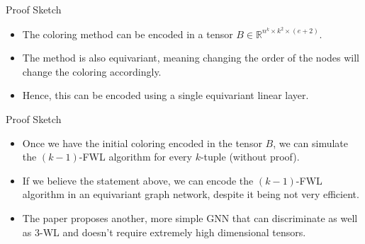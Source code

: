 \documentclass{beamer}
\begin{document}
\begin{frame}{Proof Sketch}
    \begin{itemize}
        \item The coloring method can be encoded in a tensor $B \in \mathbb{R}^{n^k \times k^2 \times (e+2)}$.
        \item The method is also equivariant, meaning changing the order of the nodes will change the coloring accordingly.
        \item Hence, this can be encoded using a single equivariant linear layer.
    \end{itemize}
\end{frame}
\begin{frame}{Proof Sketch}
    \begin{itemize}
        \item Once we have the initial coloring encoded in the tensor $B$, we can simulate the $(k-1)$-FWL algorithm for every $k$-tuple (without proof).
        \item If we believe the statement above, we can encode the $(k-1)$-FWL algorithm in an equivariant graph network, despite it being not very efficient.
        \pause
        \item The paper proposes another, more simple GNN that can discriminate as well as $3$-WL and doesn't require extremely high dimensional tensors.
    \end{itemize}
\end{frame}
\end{document}
